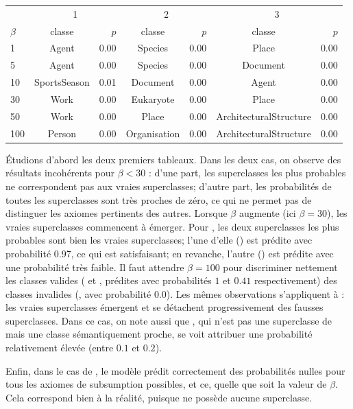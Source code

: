 \begin{table}[h]
\begin{tabular}{|l|cr|cr|cr|}
\hline
& \multicolumn{2}{c|}{1} & \multicolumn{2}{c|}{2} & \multicolumn{2}{c|}{3} \\
$\beta$	&	classe	&	$p$	&	classe	&	$p$	&	classe	&	$p$  \\ 
\hline
1 & Agent & 0.00 & Species & 0.00 & Place & 0.00 \\5 & Agent & 0.00 & Species & 0.00 & Document & 0.00 \\10 & SportsSeason & 0.01 & Document & 0.00 & Agent & 0.00 \\30 & Work & 0.00 & Eukaryote & 0.00 & Place & 0.00 \\50 & Work & 0.00 & Place & 0.00 & ArchitecturalStructure & 0.00 \\100 & Person & 0.00 & Organisation & 0.00 & ArchitecturalStructure & 0.00 \\
\hline
\end{tabular}

    \label{tab:hp-most-prob-axioms}
\end{table}



Étudions d'abord les deux premiers tableaux. Dans les deux cas, on observe des résultats incohérents pour $\beta < 30$ : d'une part, les superclasses les plus probables ne correspondent pas aux vraies superclasses; d'autre part, les probabilités de toutes les superclasses sont très proches de zéro, ce qui ne permet pas de distinguer les axiomes pertinents des autres. Lorsque $\beta$ augmente (ici $\beta = 30$), les vraies superclasses commencent à émerger. Pour , les deux superclasses les plus probables sont bien les vraies superclasses; l'une d'elle  () est prédite avec probabilité 0.97, ce qui est satisfaisant; en revanche, l'autre () est prédite avec une probabilité très faible. Il faut attendre $\beta = 100$ pour discriminer nettement les classes valides ( et , prédites avec probabilités $1$ et $0.41$ respectivement) des classes invalides (, avec probabilité $0.0$). Les mêmes observations s'appliquent à  : les vraies superclasses émergent et se détachent progressivement des fausses superclasses. Dans ce cas, on note aussi que , qui n'est pas une superclasse de  mais une classe sémantiquement proche, se voit attribuer une probabilité relativement élevée (entre $0.1$ et $0.2$).

Enfin, dans le cas de , le modèle prédit correctement des probabilités nulles pour tous les axiomes de subsumption possibles, et ce, quelle que soit la valeur de $\beta$. Cela correspond bien à la réalité, puisque  ne possède aucune superclasse.

